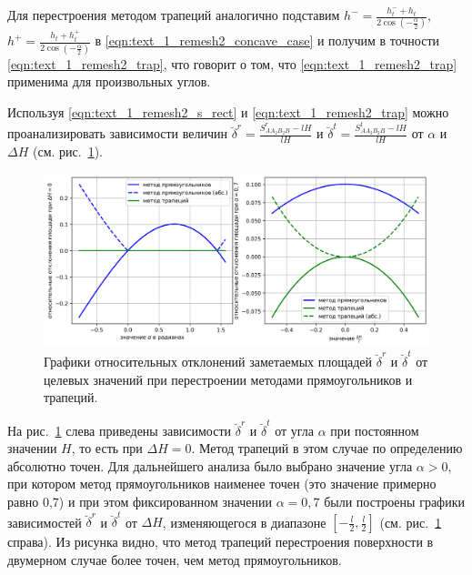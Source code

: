 Для перестроения методом трапеций аналогично подставим $h^{-} = \frac{h_t^{-} + h_t}{2 \cos\left( -\frac{\alpha}{2} \right)}$, $h^{+} = \frac{h_t + h_t^{+}}{2 \cos\left( -\frac{\alpha}{2} \right)}$ в \eqref{eqn:text_1_remesh2_concave_case} и получим в точности \eqref{eqn:text_1_remesh2_trap}, что говорит о том, что \eqref{eqn:text_1_remesh2_trap} применима для произвольных углов.

Используя \eqref{eqn:text_1_remesh2_s_rect} и \eqref{eqn:text_1_remesh2_trap} можно проанализировать зависимости величин $\breve{\delta}^r = \frac{S_{AA_2B_2B}^r - lH}{lH}$ и $\breve{\delta}^t = \frac{S_{AA_2B_2B}^t - lH}{lH}$ от $\alpha$ и $\Delta H$ (см. рис.~\ref{fig:text_1_remesh_2d_main_chart}).

\begin{figure}[h]
\onelinecaptionstrue
\centering
\includegraphics[width=1.0\textwidth]{pics/text_1_remesh_2d/main_chart.png}
\caption{Графики относительных отклонений заметаемых площадей $\breve{\delta}^r$ и $\breve{\delta}^t$ от целевых значений при перестроении методами прямоугольников и трапеций.}
\label{fig:text_1_remesh_2d_main_chart}
\end{figure}

На рис.~\ref{fig:text_1_remesh_2d_main_chart} слева приведены зависимости $\breve{\delta}^r$ и $\breve{\delta}^t$ от угла $\alpha$ при постоянном значении $H$, то есть при $\Delta H = 0$.
Метод трапеций в этом случае по определению абсолютно точен.
Для дальнейшего анализа было выбрано значение угла $\alpha > 0$, при котором метод прямоугольников наименее точен (это значение примерно равно 0,7) и при этом фиксированном значении $\alpha = 0,7$ были построены графики зависимостей $\breve{\delta}^r$ и $\breve{\delta}^t$ от $\Delta H$, изменяющегося в диапазоне $[-\frac{l}{2}, \frac{l}{2}]$ (см. рис.~\ref{fig:text_1_remesh_2d_main_chart} справа).
Из рисунка видно, что метод трапеций перестроения поверхности в двумерном случае более точен, чем метод прямоугольников.
